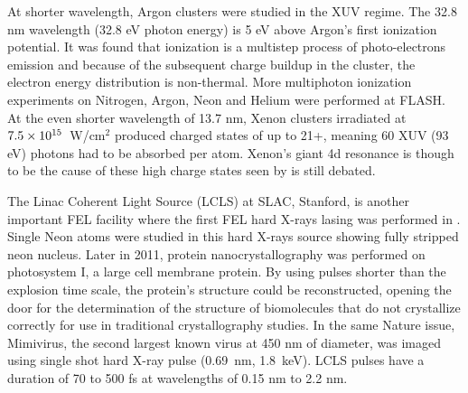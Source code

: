 At shorter wavelength,
Argon clusters were studied in the XUV regime\cite{Bostedt2008}. The 32.8 nm
wavelength (32.8 eV photon energy) is 5 eV above Argon's first ionization
potential. It was found that ionization is a multistep process of
photo-electrons emission and because of the subsequent charge buildup in the
cluster, the electron energy distribution is non-thermal. More multiphoton
ionization experiments on Nitrogen, Argon, Neon and Helium were performed at
FLASH.
At the even shorter wavelength of 13.7 nm, Xenon clusters irradiated at
$\ten{7.5}{15}$~W/cm$^2$ produced charged states of up to 21+\cite{Sorokin2007,Richter2009},
meaning 60 XUV (93 eV) photons had to be absorbed per atom. Xenon's giant 4d
resonance is though to be the cause of these high charge states seen by is still
debated.

The Linac Coherent Light Source (LCLS) at SLAC, Stanford, is another important
FEL facility where the first FEL hard X-rays lasing was performed in
\cite{Emma2010,Schneider2010}. Single Neon atoms were studied in
this hard X-rays source\cite{Young2010} showing fully stripped neon nucleus.
Later in 2011, protein nanocrystallography was performed \cite{Chapman2011}
on photosystem I, a large cell membrane protein. By using pulses shorter
than the explosion time scale, the protein's structure could be reconstructed,
opening the door for the determination of the structure of biomolecules that
do not crystallize correctly for use in traditional crystallography studies.
In the same Nature issue, Mimivirus, the second largest known virus at 450 nm
of diameter, was imaged using single shot hard X-ray pulse (0.69~nm,
1.8~keV)\cite{Seibert2011}. LCLS pulses have a duration of 70 to 500 fs at
wavelengths of 0.15 nm to 2.2 nm\cite{Pellegrini2011}.

